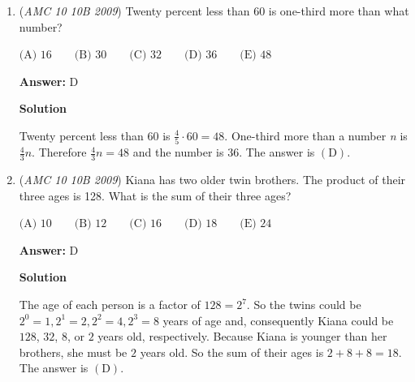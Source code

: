 \begin{enumerate}
\textbf{Solution 2}

The length of each triangle is $\frac{25-15}{2}=5$ meters. By translating then rotating the top right triangle so that it forms a square with the top left triangle, the ratio we desire is literally the ratio of the $5*5=25$ and the total area, which is $5*25=125$. Alternatively we can use side length ratios, but each way we get $\frac{25}{125}=\frac{1}{5}$. Select $\mathrm{(C)}$.

 



\textbf{Solution 3}

Let the trapezoid be defined $ABCD$ in clockwise starting from lower left vertex and the rectangle $AEFD$ exist such that $B$ and $C$ lie on $EF$. Then, drop the altitude from $B$ and $C$ so it intersects at $G$ and $H$. Then, $GH = BC = 15$ and thus $AG = HD = 5$. The triangles are 45-45-90 and thus conjoining both we have a square of side length 5 whose area is 25, and thus the ration is $\frac{25}{25 \cdot 5} = \boxed{\frac{1}{5}}$.

 


	\item (\textit{AMC 10 10B 2009}) Twenty percent less than 60 is one-third more than what number?


 $\text{(A) } 16 \qquad \text{(B) } 30 \qquad \text{(C) } 32 \qquad \text{(D) } 36 \qquad \text{(E) } 48$

 \textbf{Answer: }D



\textbf{Solution}

Twenty percent less than 60 is $\frac 45 \cdot 60 = 48$. One-third more than a number \textit{n} is $\frac 43n$. Therefore $\frac 43n = 48$ and the number is $\boxed {36}$. The answer is $\mathrm{(D)}$.

 


	\item (\textit{AMC 10 10B 2009}) Kiana has two older twin brothers.  The product of their three ages is 128.  What is the sum of their three ages?


 $\text{(A) } 10 \qquad \text{(B) } 12 \qquad \text{(C) } 16 \qquad \text{(D) } 18 \qquad \text{(E) } 24$

 \textbf{Answer: }D



\textbf{Solution}

The age of each person is a factor of $128 = 2^7$.  So the twins could be $2^0 = 1, 2^1 = 2, 2^2 = 4, 2^3 = 8$ years of age and, consequently Kiana could be $128$, $32$, $8$, or $2$ years old, respectively.  Because Kiana is younger than her brothers, she must be $2$ years old. So the sum of their ages is $2 + 8 + 8 = \boxed{18}$.  The answer is $\mathrm{(D)}$.


\end{enumerate}
